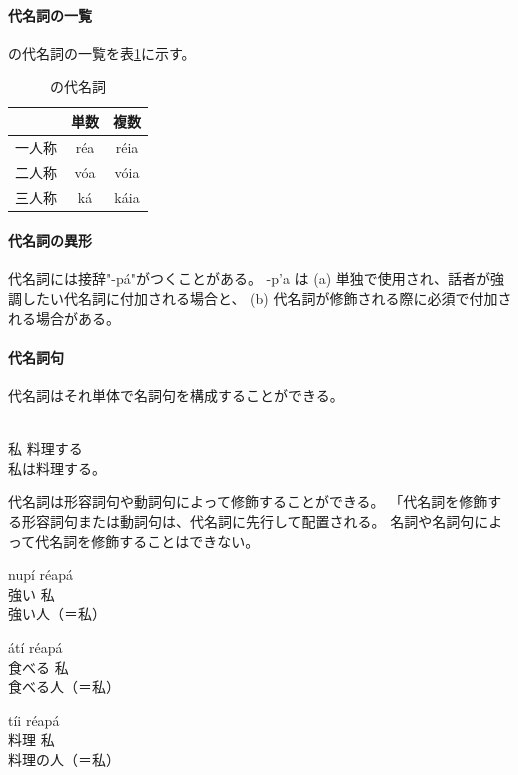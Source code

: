 \paragraph{代名詞の一覧}
\langname の代名詞の一覧を表\ref{tab:pronouns}に示す。

\begin{table}[H]
    \centering
    \begin{tabular}{lcc}
        \toprule
        & 単数 & 複数 \\
        \midrule
        一人称 & r\'ea & r\'eia \\
        二人称 & v\'oa & v\'oia \\
        三人称 & k\'a & k\'aia \\
  \bottomrule
    \end{tabular}
    \caption{\centering \langname の代名詞}
    \label{tab:pronouns}
\end{table}

\paragraph{代名詞の異形}

代名詞には接辞"-p\'a"がつくことがある。
-p'a は (a) 単独で使用され、話者が強調したい代名詞に付加される場合と、
(b) 代名詞が修飾される際に必須で付加される場合がある。

\paragraph{代名詞句}

代名詞はそれ単体で名詞句を構成することができる。

\begin{exe}
    \ex \gll [r\'ea] [p\'a\'a t\'ii nep\'e\'a] \\
        私 料理する \\
    \glt 私は料理する。
\end{exe}

代名詞は形容詞句や動詞句によって修飾することができる。
「代名詞を修飾する形容詞句または動詞句は、代名詞に先行して配置される。
名詞や名詞句によって代名詞を修飾することはできない。

\begin{exe}
    \ex \gll nup\'i r\'eap\'a \\
        強い 私 \\
    \glt 強い人（＝私）
\end{exe}
\begin{exe}
    \ex \gll \'at\'i r\'eap\'a \\
        食べる 私 \\
    \glt 食べる人（＝私）
\end{exe}
\begin{exe}
    \ex \gll *t\'ii r\'eap\'a \\
        料理 私 \\
    \glt 料理の人（＝私）
\end{exe}
